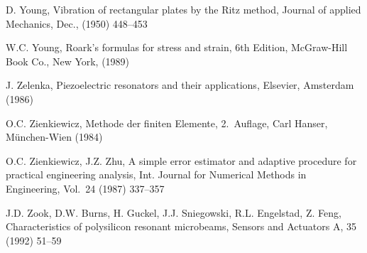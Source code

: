 \begin{thebibliography}{xxx}
 D. Young, Vibration of rectangular plates by the Ritz method, Journal of
 applied Mechanics, Dec., (1950) 448--453

  W.C. Young, Roark's formulas for stress and strain, 6th Edition, McGraw-Hill
  Book Co., New York, (1989)

  J. Zelenka, Piezoelectric resonators and their applications, Elsevier,
  Amsterdam (1986)

 O.C. Zienkiewicz, Methode der finiten Elemente, 2.~Auflage, Carl Hanser,
 München-Wien (1984)

 O.C. Zienkiewicz, J.Z. Zhu, A simple error estimator and adaptive procedure
 for practical engineering analysis, Int. Journal for Numerical Methods in
 Engineering, Vol.~24 (1987) 337--357

 J.D. Zook, D.W. Burns, H. Guckel, J.J. Sniegowski, R.L. Engelstad, Z. Feng,
 Characteristics of polysilicon resonant microbeams, Sensors and Actuators A,
 35 (1992) 51--59

\end{thebibliography}
